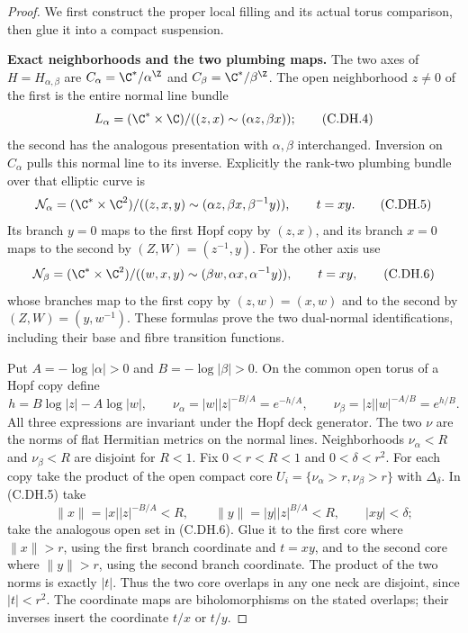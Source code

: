 \begin{proof}
We first construct the proper local filling
and its actual torus comparison, then glue
it into a compact suspension.

\par\medskip\noindent\textbf{Exact neighborhoods and the two plumbing maps.}
The two axes of $H=H_{\alpha,\beta}$ are
$C_\alpha=\C^*/\alpha^{\Z}$ and
$C_\beta=\C^*/\beta^{\Z}$. The open
neighborhood $z\ne0$ of the first is
the entire normal line bundle
\[
 L_\alpha=(\C^*\times\C)/
         ((z,x)\sim(\alpha z,\beta x));
                                                               \tag{C.DH.4}
\]
the second has the analogous presentation
with $\alpha,\beta$ interchanged.
Inversion on $C_\alpha$ pulls this
normal line to its inverse. Explicitly
the rank-two plumbing bundle over that
elliptic curve is
\[
 \mathcal N_\alpha=(\C^*\times\C^2)/
       ((z,x,y)\sim(\alpha z,\beta x,\beta^{-1}y)),
                         \qquad t=xy.               \tag{C.DH.5}
\]
Its branch $y=0$ maps to the first
Hopf copy by $(z,x)$, and its branch
$x=0$ maps to the second by
$(Z,W)=(z^{-1},y)$.
For the other axis use
\[
 \mathcal N_\beta=(\C^*\times\C^2)/
       ((w,x,y)\sim(\beta w,\alpha x,\alpha^{-1}y)),
                         \qquad t=xy,                \tag{C.DH.6}
\]
whose branches map to the first
copy by $(z,w)=(x,w)$ and to the
second by $(Z,W)=(y,w^{-1})$.
These formulas prove the two dual-normal
identifications, including their
base and fibre transition functions.

Put $A=-\log|\alpha|>0$ and
$B=-\log|\beta|>0$. On the common
open torus of a Hopf copy define
\[
 h=B\log|z|-A\log|w|,\qquad
 \nu_\alpha=|w||z|^{-B/A}=e^{-h/A},\qquad
 \nu_\beta=|z||w|^{-A/B}=e^{h/B}.        \tag{C.DH.7}
\]
All three expressions are invariant
under the Hopf deck generator.
The two $\nu$ are the norms of
flat Hermitian metrics on the
normal lines. Neighborhoods
$\nu_\alpha<R$ and $\nu_\beta<R$
are disjoint for $R<1$.
Fix $0<r<R<1$ and $0<\delta<r^2$.
For each copy take the product
of the open compact core
$U_i=\{\nu_\alpha>r,\nu_\beta>r\}$
with $\Delta_\delta$.
In (C.DH.5) take
\[
 \|x\|=|x||z|^{-B/A}<R,
 \qquad \|y\|=|y||z|^{B/A}<R,
 \qquad |xy|<\delta;                                \tag{C.DH.8}
\]
take the analogous open set in
(C.DH.6). Glue it to the first
core where $\|x\|>r$, using the
first branch coordinate and
$t=xy$, and to the second core
where $\|y\|>r$, using the second
branch coordinate. The product
of the two norms is exactly
$|t|$. Thus the two core
overlaps in any one neck are
disjoint, since $|t|<r^2$.
The coordinate maps are
biholomorphisms on the stated
overlaps; their inverses insert
the coordinate $t/x$ or $t/y$.


\end{proof}
